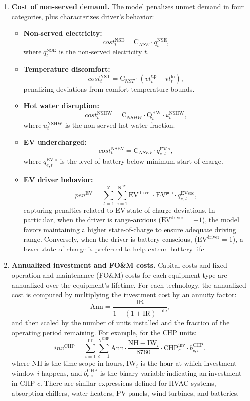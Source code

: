 \documentclass[11pt]{article}
\begin{document}
\begin{enumerate}
    \item \textbf{Cost of non-served demand.} The model penalizes unmet demand in four categories, plus characterizes driver's behavior:
    \begin{itemize}
        \item \textbf{Non-served electricity:}
        \[
        cost^\text{NSE}_t = \text{C}_{NSE} \cdot q^\text{NSE}_t,
        \]
        where \(q^\text{NSE}_t\) is the non-served electricity \(t\).
        \item \textbf{Temperature discomfort:}
        \[
        cost^\text{NST}_t = \text{C}_{NST} \cdot \left(vt^\text{up}_t + vt^\text{lo}_t\right),
        \]
        penalizing deviations from comfort temperature bounds.
        \item \textbf{Hot water disruption:}
        \[
        cost^\text{NSHW}_t = \text{C}_{NSHW} \cdot \text{Q}^\text{HW}_t \cdot u^\text{NSHW}_t,
        \]
        where \(u^\text{NSHW}_t\) is the non-served hot water fraction.
        \item \textbf{EV undercharged:}
        \[
        cost^\text{NSEV}_t = \text{C}_{NSEV} \cdot q^\text{EVlo}_{e,t},
        \]
        where \(q^\text{EVlo}_{e,t}\) is the level of battery below minimum start-of-charge.
        \item \textbf{EV driver behavior:}
        \[
        pen^\text{EV} = \sum_{t=1}^{\mathcal{T}}\sum_{e=1}^{\text{N}^\text{EV}} \text{EV}^\text{driver} \cdot \text{EV}^\text{pen} \cdot q^\text{EVsoc}_{e,t},
        \]
        capturing penalties related to EV state-of-charge deviations. In particular, when the driver is range‐anxious (\(\text{EV}^\text{driver} = -1\)), the model favors maintaining a higher state-of-charge to ensure adequate driving range. Conversely, when the driver is battery‐conscious, (\(\text{EV}^\text{driver} = 1\)), a lower state-of-charge is preferred to help extend battery life.
    \end{itemize}
    
    \item \textbf{Annualized investment and FO\&M costs.} Capital costs and fixed operation and maintenance (FO\&M) costs for each equipment type are annualized over the equipment’s lifetime. For each technology, the annualized cost is computed by multiplying the investment cost by an annuity factor:
    \[
    \text{Ann} = \frac{\text{IR}}{1 - (1+\text{IR})^{-\text{life}}},
    \]
    and then scaled by the number of units installed and the fraction of the operating period remaining. For example, for the CHP units:
    \[
    inv^\text{CHP} = \sum_{i=1}^\text{IT} \sum_{c=1}^{\text{N}^\text{CHP}} \text{Ann} \cdot \frac{\text{NH} - \text{IW}_i}{8760} \cdot \text{CHP}^\text{inv}_c \cdot b^\text{CHP}_{c,i},
    \]
    where NH is the time scope in hours, \(\text{IW}_i\) is the hour at which investment window \(i\) happens, and \(b^\text{CHP}_{c,i}\) is the binary variable indicating an investment in CHP \(c\). There are similar expressions defined for HVAC systems, absorption chillers, water heaters, PV panels, wind turbines, and batteries.
    

\end{enumerate}
\end{document}
